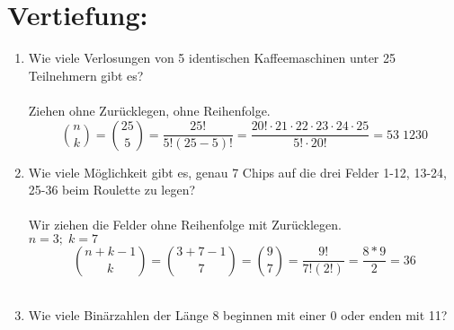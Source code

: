 



	\maketitle
	\section*{Vertiefung:}
	\begin{enumerate}[label=(\alph*)]
		\item  Wie viele Verlosungen von 5 identischen Kaffeemaschinen unter 25 Teilnehmern gibt es? \\
		\\Ziehen ohne Zurücklegen, ohne Reihenfolge.\\	
		$${n \choose k}= {25 \choose 5}= \frac{25!}{5!(25-5)!}= \frac{20!\cdot 21 \cdot 22 \cdot 23 \cdot 24 \cdot 25}{5! \cdot 20!} = 53 \; 1230 $$
		\item Wie viele Möglichkeit gibt es, genau 7 Chips auf die drei Felder 1-12, 13-24, 25-36 beim Roulette zu legen?
		\\
		\\ 
		Wir ziehen die Felder ohne Reihenfolge mit Zur\"ucklegen.\\
		$n=3; \; k=7$ \\
		$$ \binom{n+k-1}{k}= \binom{3+7-1}{7}= \binom{9}{7}=
		\frac{9!}{7!(2!)}= \frac{8*9}{2}=36 $$ \\ 
		\item Wie viele Bin\"arzahlen der L\"ange 8 beginnen mit einer 0 oder enden mit 11?
		\\
		\\
		 
		
	\end{enumerate}
